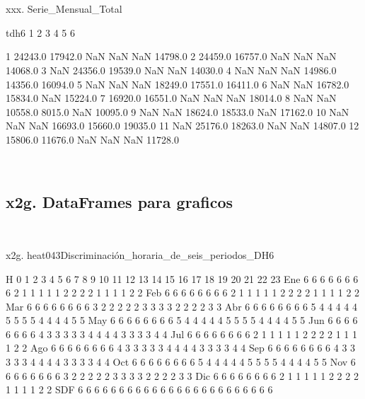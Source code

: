 \documentclass[a4paper,10pt]{article}
\begin{document}
\begin{Form}
 \

\

xxx. Serie_Mensual_Total

tdh6        1        2        3        4        5        6
                                                          
1     24243.0  17942.0      NaN      NaN      NaN  14798.0
2     24459.0  16757.0      NaN      NaN      NaN  14068.0
3         NaN  24356.0  19539.0      NaN      NaN  14030.0
4         NaN      NaN      NaN  14986.0  14356.0  16094.0
5         NaN      NaN      NaN  18249.0  17551.0  16411.0
6         NaN      NaN  16782.0  15834.0      NaN  15224.0
7     16920.0  16551.0      NaN      NaN      NaN  18014.0
8         NaN      NaN  10558.0   8015.0      NaN  10095.0
9         NaN      NaN  18624.0  18533.0      NaN  17162.0
10        NaN      NaN      NaN  16693.0  15660.0  19035.0
11        NaN  25176.0  18263.0      NaN      NaN  14807.0
12    15806.0  11676.0      NaN      NaN      NaN  11728.0 \

\
\newpage 
\subsection{x2g. DataFrames para graficos}\

x2g. heat043Discriminación_horaria_de_seis_periodos_DH6

H    0   1   2   3   4   5   6   7   8   9   10  11  12  13  14  15  16  17  18  19  20  21  22  23
Ene   6   6   6   6   6   6   6   6   2   1   1   1   1   1   2   2   2   2   1   1   1   1   2   2
Feb   6   6   6   6   6   6   6   6   2   1   1   1   1   1   2   2   2   2   1   1   1   1   2   2
Mar   6   6   6   6   6   6   6   6   3   2   2   2   2   2   3   3   3   3   2   2   2   2   3   3
Abr   6   6   6   6   6   6   6   6   5   4   4   4   4   4   5   5   5   5   4   4   4   4   5   5
May   6   6   6   6   6   6   6   6   5   4   4   4   4   4   5   5   5   5   4   4   4   4   5   5
Jun   6   6   6   6   6   6   6   6   4   3   3   3   3   3   4   4   4   4   3   3   3   3   4   4
Jul   6   6   6   6   6   6   6   6   2   1   1   1   1   1   2   2   2   2   1   1   1   1   2   2
Ago   6   6   6   6   6   6   6   6   4   3   3   3   3   3   4   4   4   4   3   3   3   3   4   4
Sep   6   6   6   6   6   6   6   6   4   3   3   3   3   3   4   4   4   4   3   3   3   3   4   4
Oct   6   6   6   6   6   6   6   6   5   4   4   4   4   4   5   5   5   5   4   4   4   4   5   5
Nov   6   6   6   6   6   6   6   6   3   2   2   2   2   2   3   3   3   3   2   2   2   2   3   3
Dic   6   6   6   6   6   6   6   6   2   1   1   1   1   1   2   2   2   2   1   1   1   1   2   2
SDF   6   6   6   6   6   6   6   6   6   6   6   6   6   6   6   6   6   6   6   6   6   6   6   6 \


\end{Form}
\end{document}
